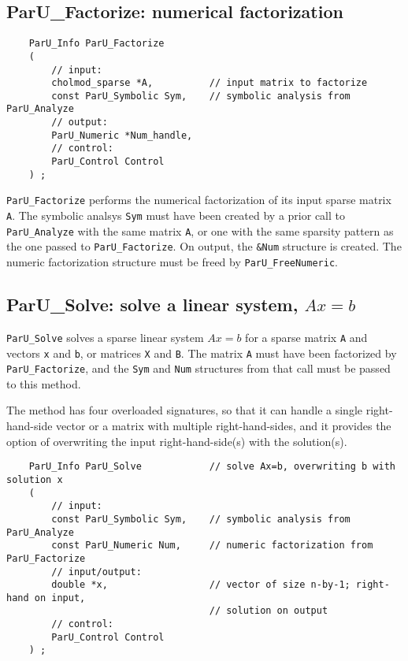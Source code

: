 \documentclass[12pt]{article}
\begin{document}
\subsection{{\sf ParU\_Factorize}: numerical factorization}

    {\footnotesize
    \begin{verbatim}
    ParU_Info ParU_Factorize
    (
        // input:
        cholmod_sparse *A,          // input matrix to factorize
        const ParU_Symbolic Sym,    // symbolic analysis from ParU_Analyze
        // output:
        ParU_Numeric *Num_handle,
        // control:
        ParU_Control Control
    ) ; \end{verbatim}}

    \verb'ParU_Factorize' performs the numerical factorization of its input
    sparse matrix \verb'A'.  The symbolic analsys \verb'Sym' must have been
    created by a prior call to \verb'ParU_Analyze' with the same matrix
    \verb'A', or one with the same sparsity pattern as the one passed to
    \verb'ParU_Factorize'.  On output, the \verb'&Num' structure is created.
    The numeric factorization structure must be freed by
    \verb'ParU_FreeNumeric'.

\subsection{{\sf ParU\_Solve}: solve a linear system, $Ax=b$}

    \verb'ParU_Solve' solves a sparse linear system $Ax=b$ for a sparse
    matrix \verb'A' and vectors \verb'x' and \verb'b', or matrices
    \verb'X' and \verb'B'.  The matrix \verb'A' must have been factorized
    by \verb'ParU_Factorize', and the \verb'Sym' and \verb'Num' structures
    from that call must be passed to this method.

    The method has four overloaded signatures, so that it can handle a single
    right-hand-side vector or a matrix with multiple right-hand-sides, and it
    provides the option of overwriting the input right-hand-side(s) with the
    solution(s).

    {\footnotesize
    \begin{verbatim}
    ParU_Info ParU_Solve            // solve Ax=b, overwriting b with solution x
    (
        // input:
        const ParU_Symbolic Sym,    // symbolic analysis from ParU_Analyze
        const ParU_Numeric Num,     // numeric factorization from ParU_Factorize
        // input/output:
        double *x,                  // vector of size n-by-1; right-hand on input,
                                    // solution on output
        // control:
        ParU_Control Control
    ) ; \end{verbatim} }
\end{document}
